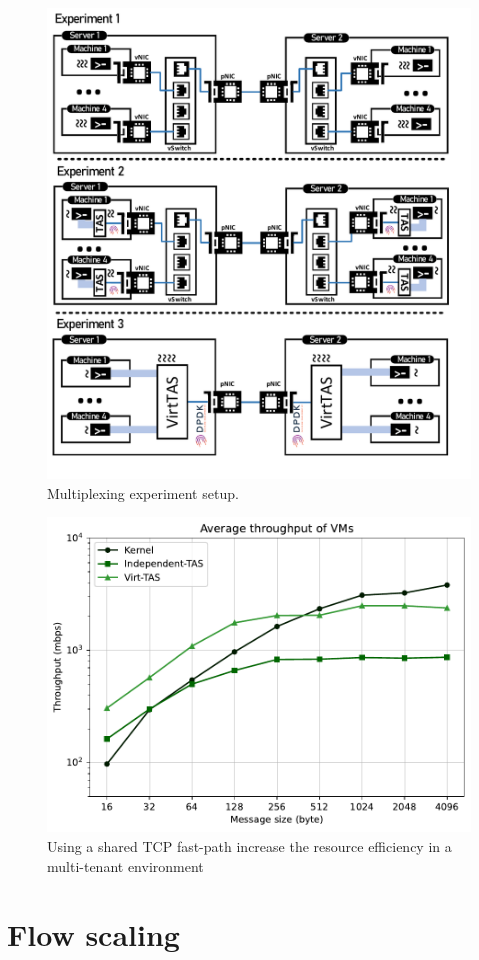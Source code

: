 \begin{figure}
    \centering
    \includegraphics[scale=0.75]{../Figures/multiplexing.experiment.pdf}
    \caption{Multiplexing experiment setup.}
    \label{fig:multiplexing.experiment}
\end{figure}

\begin{figure}
    \centering
    \includegraphics[scale=0.8]{../results/multiplex.throughput.pdf}
    \caption{Using a shared TCP fast-path increase the resource efficiency in  a multi-tenant environment}
    \label{fig:multiplex.throughput}
\end{figure}



\section{Flow scaling}